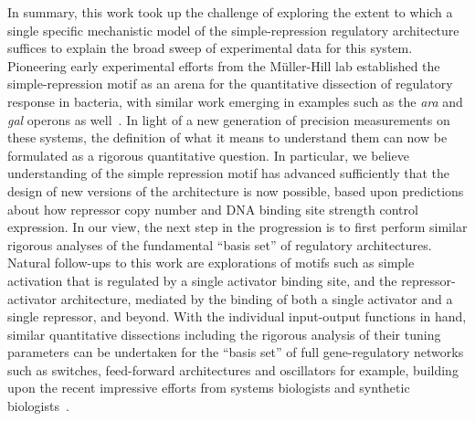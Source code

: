In summary, this work took up the challenge of exploring the extent to which a
single specific mechanistic model of the simple-repression regulatory
architecture suffices to explain the broad sweep of experimental data for this
system. Pioneering early experimental efforts from the M\"{u}ller-Hill lab
established the simple-repression motif as an arena for the quantitative
dissection of regulatory response in bacteria, with similar work emerging in
examples such as the \textit{ara} and \textit{gal} operons as
well~\cite{Dunn1984b, Oehler1990, Weickert1993, Oehler1994, Schleif2000,
Semsey2002, SwintKruse2009}. In light of a new generation of precision
measurements on these systems, the definition of what it means to understand
them can now be formulated as a rigorous quantitative question. In particular,
we believe understanding of the simple repression motif has advanced
sufficiently that the design of new versions of the architecture is now
possible, based upon predictions about how repressor copy number and DNA binding
site strength control expression. In our view, the next step in the progression
is to first perform similar rigorous analyses of the fundamental ``basis set''
of regulatory architectures. Natural follow-ups to this work are explorations of
motifs such as simple activation that is regulated by a single activator binding
site, and the repressor-activator architecture, mediated by the binding of both
a single activator and a single repressor, and beyond. With the individual
input-output functions in hand, similar quantitative dissections including the
rigorous analysis of their tuning parameters can be undertaken for the ``basis
set'' of full gene-regulatory networks such as switches, feed-forward
architectures and oscillators for example, building upon the recent impressive
efforts from systems biologists and synthetic biologists~\cite{Milo2002,
Alon2007}.